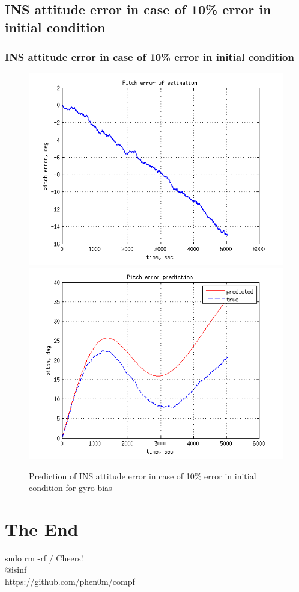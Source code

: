 \documentclass[compress]{beamer}    %
\begin{document}
\subsection{INS attitude error in case of 10\% error in initial condition}
\begin{frame}
\frametitle{INS attitude error in case of 10\% error in initial condition}
\noindent

\begin{figure}[l]
  \centering
  \includegraphics[scale=0.41]{theta_err_of_err_2}
  \includegraphics[scale=0.41]{theta_err_2}
  \caption{Prediction of  INS attitude error in case of 10\% error in initial condition for gyro bias}
  \label{fig:comp_pos}
\end{figure}
\end{frame}
\section{The End} 
\begin{frame}%
\begin{block}{sudo rm -rf / }
  \centering
  Cheers! \\
  @isinf\\
  https://github.com/phen0m/compf

\end{block}
\end{frame}

\end{document}
